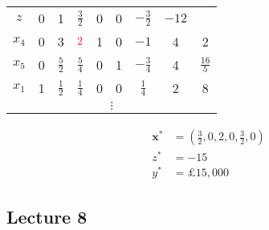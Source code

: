 \documentclass[a4paper, 12pt]{article}
\renewcommand{\vec}[1]{\boldsymbol{#1}}
\newcommand{\red}[1]{\textcolor{red}{#1}}
\begin{document}
\begin{enumerate}[1.]
\begin{center}
\begin{tabular}{c|cccccc|c|c}
                                \hline
                                $z$ & 0 & 1 & $\frac{3}{2}$ & 0 & 0 & $-\frac{3}{2}$ & $-12$ & \\
                                $x_4$ & 0 & 3 & $\red{2}$ & 1 & 0 & $-1$ & 4 & 2 \\
                                $x_5$ & 0 & $\frac{5}{2}$ & $\frac{5}{4}$ & 0 & 1 & $-\frac{3}{4}$ & 4 & $\frac{16}{5}$ \\
                                $x_1$ & 1 & $\frac{1}{2}$ & $\frac{1}{4}$ & 0 & 0 & $\frac{1}{4}$ & 2 & 8 \\
                                \hline
                                \multicolumn{9}{c}{$\vdots$}
                            \end{tabular}
                        \end{center}
                        \begin{align*}
                            \vec{x^*} & = \left(\frac{3}{2}, 0, 2, 0, \frac{3}{2}, 0\right) \\
                            z^* & = -15 \\
                            y^* & = \text{£}15,000
                        \end{align*}
                \end{enumerate}
        \subsection*{Lecture 8}
\end{document}
